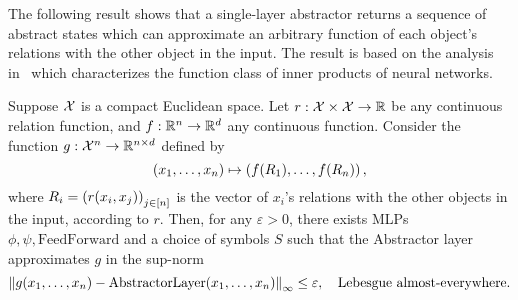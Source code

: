 The following result shows that a single-layer abstractor returns a sequence of abstract states which can approximate an arbitrary function of each object's relations with the other object in the input. The result is based on the analysis in~\citep{altabaaApproximationRelationFunctions2024} which characterizes the function class of inner products of neural networks.

\begin{theorem}
    Suppose ${\mathcal{X}}$ is a compact Euclidean space. Let $r: {\mathcal{X}} \times {\mathcal{X}} \to \mathbb{R}$ be any continuous relation function, and $f: \mathbb{R}^n \to \mathbb{R}^d$ any continuous function. Consider the function $g: {\mathcal{X}}^n \to \mathbb{R}^{n \times d}$ defined by
    \begin{equation*}
        (x_1, \ldots, x_n) \mapsto \left(f(R_1), \ldots, f(R_n)\right),
    \end{equation*}
    where $R_i = {(r(x_i, x_j))}_{j \in [n]}$ is the vector of $x_i$'s relations with the other objects in the input, according to $r$. Then, for any $\varepsilon > 0$, there exists MLPs $\phi, \psi, \mathrm{FeedForward}$ and a choice of symbols $S$ such that the Abstractor layer approximates $g$ in the sup-norm
    \begin{equation*}
        \left\lVert g(x_1, \ldots, x_n) - \mathrm{AbstractorLayer}(x_1, \ldots, x_n)\right\rVert_{\infty} \leq \varepsilon, \quad \text{Lebesgue almost-everywhere.}
    \end{equation*}
\end{theorem}
